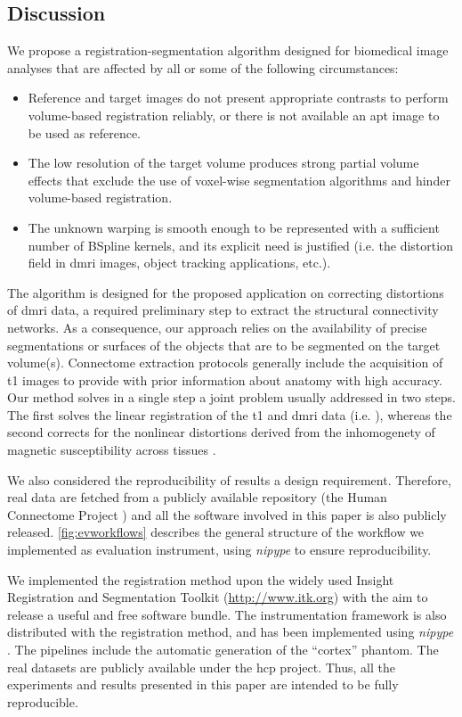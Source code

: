 \subsection*{Discussion}
\label{sec:discussion}
We propose a registration-segmentation algorithm designed for biomedical
  image analyses that are affected by all or some of the following circumstances:
  \begin{itemize}
  	\item Reference and target images do not present appropriate contrasts to
  	perform volume-based registration reliably, or there is not available an apt image
 		to be used as reference.
  	\item The low resolution of the target volume produces strong partial volume effects
  	that exclude the use of voxel-wise segmentation algorithms and hinder volume-based
  	registration.
  	\item The unknown warping is smooth enough to be represented with a sufficient number
  	of BSpline kernels, and its explicit need is justified (i.e. the distortion
  	field in \gls*{dmri} images, object tracking applications, etc.).
  \end{itemize}
The algorithm is designed for the proposed application on correcting distortions of
  \gls*{dmri} data, a required preliminary step to extract the structural connectivity
  networks.
As a consequence, our approach relies on the availability of precise segmentations or
  surfaces of the objects that are to be segmented on the target volume(s).
Connectome extraction protocols generally include the acquisition of \gls*{t1} images
  to provide with prior information about anatomy with high accuracy.
Our method solves in a single step a joint problem usually addressed in two steps.
The first solves the linear registration of the \gls*{t1} and \gls*{dmri} data (i.e.
  \cite{greve_accurate_2009}), whereas the second corrects for the nonlinear distortions
  derived from the inhomogenety of magnetic susceptibility across tissues
  \citep{jezzard_correction_1995}.

{\color{red} We also considered the reproducibility of results a design requirement.
Therefore, real data are fetched from a publicly available repository
  (the Human Connectome Project \citep{essen_human_2012}) and all the software
  involved in this paper is also publicly released.
\autoref{fig:evworkflows} describes the general structure of the workflow we implemented
  as evaluation instrument, using \emph{nipype} \citep{gorgolewski_nipype_2011} to ensure
  reproducibility.}

We implemented the registration method upon the widely used Insight Registration and Segmentation
	Toolkit (\url{http://www.itk.org}) with the aim to release a useful and free software bundle.
The instrumentation framework is also distributed with the registration method,
  and has been implemented using \emph{nipype} \citep{gorgolewski_nipype_2011}.
The pipelines include the automatic generation of the ``cortex'' phantom.
The real datasets are publicly available under the \gls*{hcp} project.
Thus, all the experiments and results presented in this paper are intended to be
  fully reproducible.